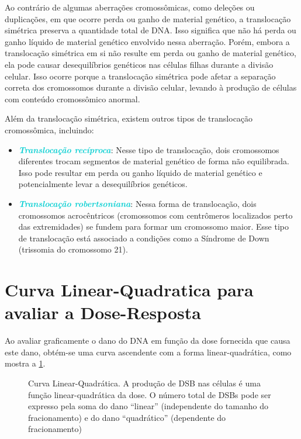 \documentclass[11pt,a4paper]{article}
\begin{document}
	Ao contrário de algumas aberrações cromossômicas, como deleções ou duplicações, em que ocorre perda ou ganho de material genético, a translocação simétrica preserva a quantidade total de DNA. Isso significa que não há perda ou ganho líquido de material genético envolvido nessa aberração. Porém, embora a translocação simétrica em si não resulte em perda ou ganho de material genético, ela pode causar desequilíbrios genéticos nas células filhas durante a divisão celular. Isso ocorre porque a translocação simétrica pode afetar a separação correta dos cromossomos durante a divisão celular, levando à produção de células com conteúdo cromossômico anormal.

	Além da translocação simétrica, existem outros tipos de translocação cromossômica, incluindo:

	\begin{itemize}
		\item \textcolor{DarkTurquoise}{\textbf{\textit{Translocação recíproca}}}: Nesse tipo de translocação, dois cromossomos diferentes trocam segmentos de material genético de forma não equilibrada. Isso pode resultar em perda ou ganho líquido de material genético e potencialmente levar a desequilíbrios genéticos.
		\item \textcolor{DarkTurquoise}{\textbf{\textit{Translocação robertsoniana}}}: Nessa forma de translocação, dois cromossomos acrocêntricos (cromossomos com centrômeros localizados perto das extremidades) se fundem para formar um cromossomo maior. Esse tipo de translocação está associado a condições como a Síndrome de Down (trissomia do cromossomo 21).
	\end{itemize}


\section{Curva Linear-Quadratica para avaliar a Dose-Resposta}

	Ao avaliar graficamente o dano do DNA em função da dose fornecida que causa este dano, obtém-se uma curva ascendente com a forma linear-quadrática, como mostra a \ref{fig:DbsLinearQuadratico}.

	\begin{figure}[h]
		\centering
		\caption{Curva Linear-Quadrática. A produção de DSB nas células é uma função linear-quadrática da dose. O número total de DSBs pode ser expresso pela soma do dano ``linear'' (independente do tamanho do fracionamento) e do dano ``quadrático'' (dependente do fracionamento)}
		\label{fig:DbsLinearQuadratico}
	\end{figure}
\end{document}
